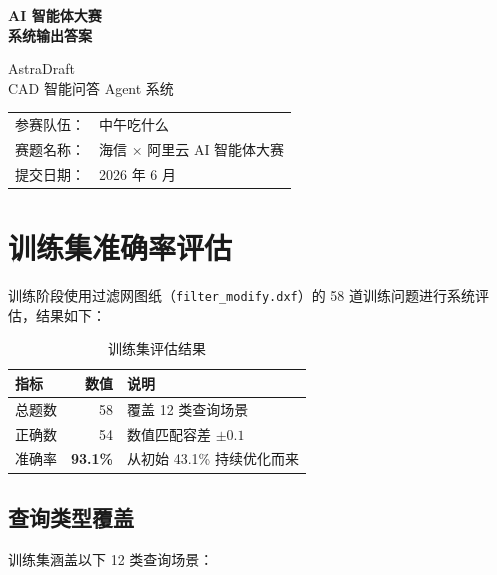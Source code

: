 \documentclass[11pt,a4paper]{article}
\begin{document}
\begin{titlepage}
  \centering
  \vspace*{3cm}

  {\Huge\bfseries AI 智能体大赛 \\[6pt]
   系统输出答案}

  \vspace{1.5cm}

  {\LARGE AstraDraft \\[8pt]
   CAD 智能问答 Agent 系统}

  \vspace{3cm}

  {\large
   \begin{tabular}{rl}
     参赛队伍： & 中午吃什么 \\
     赛题名称： & 海信 × 阿里云 AI 智能体大赛 \\
     提交日期： & 2026 年 6 月 \\
   \end{tabular}
  }

  \vfill
\end{titlepage}

\section{训练集准确率评估}

训练阶段使用过滤网图纸（\texttt{filter\_modify.dxf}）的 58 道训练问题进行系统评估，结果如下：

\begin{table}[h]
\centering
\begin{tabular}{lrl}
\toprule
指标 & 数值 & 说明 \\
\midrule
总题数 & 58 & 覆盖 12 类查询场景 \\
正确数 & 54 & 数值匹配容差 \(\pm 0.1\) \\
准确率 & \textbf{93.1\%} & 从初始 43.1\% 持续优化而来 \\
\bottomrule
\end{tabular}
\caption{训练集评估结果}
\end{table}

\subsection{查询类型覆盖}

训练集涵盖以下 12 类查询场景：
\end{document}
